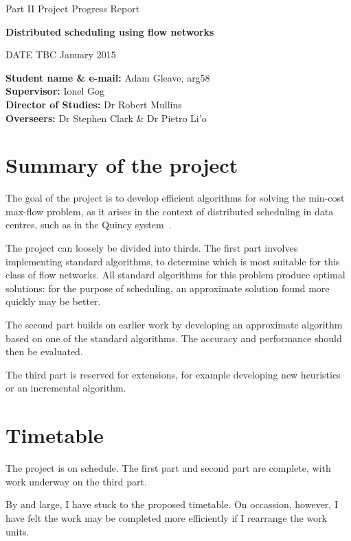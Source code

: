 
\centerline{\Large Part II Project Progress Report}
\vspace{0.2in}
\centerline{\large \textbf{Distributed scheduling using flow networks}}
\vspace{0.2in}
\centerline{DATE TBC January 2015}


\textbf{Student name \& e-mail:} Adam Gleave, arg58 \hfil \\
\textbf{Supervisor:} Ionel Gog \hfil \\
\textbf{Director of Studies:} Dr Robert Mullins \hfil \\
\textbf{Overseers:} Dr Stephen Clark \& Dr Pietro Li\a'o \hfil \\


\section{Summary of the project}
The goal of the project is to develop efficient algorithms for solving the min-cost max-flow problem, as it arises in the context of distributed scheduling in data centres, such as in the Quincy system~\cite{Isard:2009}. 

The project can loosely be divided into thirds. The first part involves implementing standard algorithms, to determine which is most suitable for this class of flow networks. All standard algorithms for this problem produce optimal solutions: for the purpose of scheduling, an approximate solution found more quickly may be better. 

The second part builds on earlier work by developing an approximate algorithm based on one of the standard algorithms. The accuracy and performance should then be evaluated.

The third part is reserved for extensions, for example developing new heuristics or an incremental algorithm.

\section{Timetable}
The project is on schedule. The first part and second part are complete, with work underway on the third part. 

By and large, I have stuck to the proposed timetable. On occassion, however, I have felt the work may be completed more efficiently if I rearrange the work units. 

